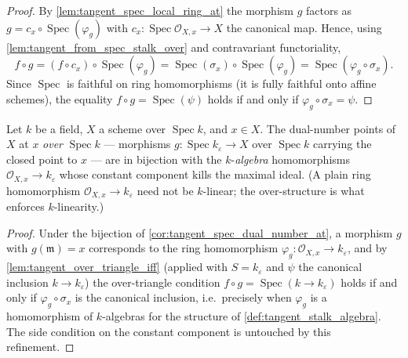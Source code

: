 \begin{proof}\leanok
  By \cref{lem:tangent_spec_local_ring_at} the morphism \(g\) factors
  as \(g = c_x \circ \operatorname{Spec}(\varphi_g)\) with
  \(c_x : \operatorname{Spec} \mathcal O_{X,x} \to X\) the canonical
  map. Hence, using \cref{lem:tangent_from_spec_stalk_over} and
  contravariant functoriality,
  \[
    f \circ g
      = (f \circ c_x) \circ \operatorname{Spec}(\varphi_g)
      = \operatorname{Spec}(\sigma_x) \circ \operatorname{Spec}(\varphi_g)
      = \operatorname{Spec}(\varphi_g \circ \sigma_x).
  \]
  Since \(\operatorname{Spec}\) is faithful on ring homomorphisms (it
  is fully faithful onto affine schemes), the equality
  \(f \circ g = \operatorname{Spec}(\psi)\) holds if and only if
  \(\varphi_g \circ \sigma_x = \psi\).
\end{proof}

\begin{corollary}\leanok
  \label{cor:tangent_over_dual_number_alghom}
  Let \(k\) be a field, \(X\) a scheme over \(\operatorname{Spec} k\),
  and \(x \in X\). The dual-number points of \(X\) at \(x\) \emph{over}
  \(\operatorname{Spec} k\) — morphisms
  \(g : \operatorname{Spec} k_\varepsilon \to X\) over
  \(\operatorname{Spec} k\) carrying the closed point to \(x\) — are in
  bijection with the \(k\)-\emph{algebra} homomorphisms
  \(\mathcal O_{X,x} \to k_\varepsilon\) whose constant component kills
  the maximal ideal. (A plain ring homomorphism
  \(\mathcal O_{X,x} \to k_\varepsilon\) need not be \(k\)-linear; the
  over-structure is what enforces \(k\)-linearity.)
\end{corollary}

\begin{proof}\leanok
  Under the bijection of \cref{cor:tangent_spec_dual_number_at},
  a morphism \(g\) with \(g(\mathfrak m) = x\) corresponds to the ring
  homomorphism \(\varphi_g : \mathcal O_{X,x} \to k_\varepsilon\), and
  by \cref{lem:tangent_over_triangle_iff} (applied with
  \(S = k_\varepsilon\) and \(\psi\) the canonical inclusion
  \(k \to k_\varepsilon\)) the over-triangle condition
  \(f \circ g = \operatorname{Spec}(k \to k_\varepsilon)\) holds if and
  only if \(\varphi_g \circ \sigma_x\) is the canonical inclusion,
  i.e.\ precisely when \(\varphi_g\) is a homomorphism of
  \(k\)-algebras for the structure of
  \cref{def:tangent_stalk_algebra}. The side condition on the constant
  component is untouched by this refinement.
\end{proof}

